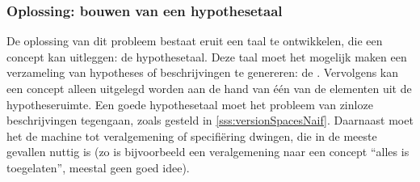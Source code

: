 \subsubsection{Oplossing: bouwen van een hypothesetaal}
De oplossing van dit probleem bestaat eruit een taal te ontwikkelen, die een concept kan uitleggen: de hypothesetaal. Deze taal moet het mogelijk maken een verzameling van hypotheses of beschrijvingen te genereren: de . Vervolgens kan een concept alleen uitgelegd worden aan de hand van één van de elementen uit de hypotheseruimte. Een goede hypothesetaal moet het probleem van zinloze beschrijvingen tegengaan, zoals gesteld in \ref{sss:versionSpacesNaif}. Daarnaast moet het de machine tot veralgemening of specifiëring dwingen, die in de meeste gevallen nuttig is (zo is bijvoorbeeld een veralgemening naar een concept ``alles is toegelaten'', meestal geen goed idee).
